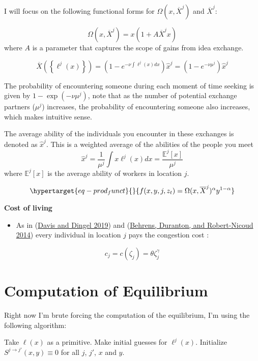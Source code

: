 \documentclass[
  letterpaper,
  DIV=11,
  numbers=noendperiod]{scrartcl}
\providecommand{\tightlist}{%
  \setlength{\itemsep}{0pt}\setlength{\parskip}{0pt}}\usepackage{longtable,booktabs,array}
\begin{document}
I will focus on the following functional forms for
\(\Omega(x, \overline{X}^j)\) and \(\overline{X}^j\):

\[\Omega(x, \overline{X}^j) = x(1 + A \overline{X}^j x)\] where \(A\) is
a parameter that captures the scope of gains from idea exchange.

\[
    \overline{X}\left(\left\{\ell^j(x)\right\}\right) = \left(1 - e^{-\nu \int \ell^j(x) dx}\right)\hat{x}^j =\left(1 - e^{-\nu \mu^j} \right)\hat{x}^j
\]

The probability of encountering someone during each moment of time
seeking is given by \(1 - \exp(-ν \mu^j)\), note that as the number of
potential exchange partners (\(\mu^j\)) increases, the probability of
encountering someone also increases, which makes intuitive sense.

The average ability of the individuals you encounter in these exchanges
is denoted as \(\hat{x}^j\). This is a weighted average of the abilities
of the people you meet
\[\hat{x}^j = \frac{1}{\mu^j}\int{x\ell^j(x)dx}=\frac{\mathbb{E}^j[x]}{\mu^j}\]
where \(\mathbb{E}^j[x]\) is the average ability of workers in location
\(j\).

\begin{equation}\protect\hypertarget{eq-prod_funct}{}{
f(x,y,j,z_t) = \Omega(x,\overline{X}^j)^\alpha y^{1-\alpha}
}\label{eq-prod_funct}\end{equation}

\textbf{Cost of living}

\begin{itemize}
\tightlist
\item
  As in (\protect\hyperlink{ref-davisSpatialKnowledgeEconomy2019}{Davis
  and Dingel 2019}) and
  (\protect\hyperlink{ref-behrensProductiveCitiesSorting2014a}{Behrens,
  Duranton, and Robert-Nicoud 2014}) every individual in location \(j\)
  pays the congestion cost :
\end{itemize}

\[c_j = c(\zeta_j) = \theta\zeta_j^{\gamma}\]

\hypertarget{computation-of-equilibrium}{%
\section{Computation of Equilibrium}\label{computation-of-equilibrium}}

Right now I'm brute forcing the computation of the equilibrium, I'm
using the following algorithm:

Take \(\ell(x)\) as a primitive. Make initial guesses for \(\ell^j(x)\).
Initialize \(S^{j \to j'}(x,y) \equiv 0\) for all \(j\), \(j'\), \(x\)
and \(y\).
\end{document}
